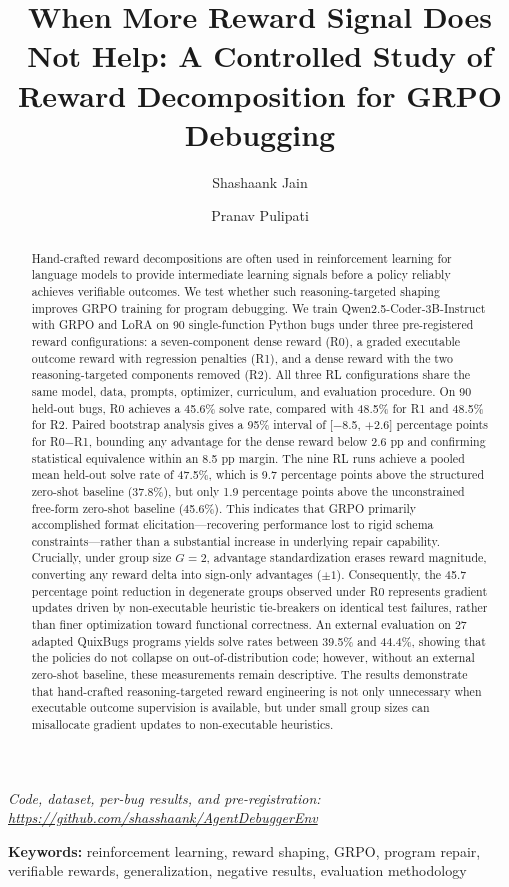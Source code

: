 \documentclass{article}
\title{When More Reward Signal Does Not Help: A Controlled Study of Reward Decomposition for GRPO Debugging}
\author{Shashaank Jain \and Pranav Pulipati}
\begin{document}
\maketitle

\begin{center}
\textit{Code, dataset, per-bug results, and pre-registration: \url{https://github.com/shasshaank/AgentDebuggerEnv}}
\end{center}

\vspace{0.3cm}
\noindent \textbf{Keywords:} reinforcement learning, reward shaping, GRPO, program repair, verifiable rewards, generalization, negative results, evaluation methodology
\vspace{0.3cm}

\begin{abstract}
Hand-crafted reward decompositions are often used in reinforcement learning for language models to provide intermediate learning signals before a policy reliably achieves verifiable outcomes. We test whether such reasoning-targeted shaping improves GRPO training for program debugging. We train Qwen2.5-Coder-3B-Instruct with GRPO and LoRA on 90 single-function Python bugs under three pre-registered reward configurations: a seven-component dense reward (R0), a graded executable outcome reward with regression penalties (R1), and a dense reward with the two reasoning-targeted components removed (R2). All three RL configurations share the same model, data, prompts, optimizer, curriculum, and evaluation procedure. On 90 held-out bugs, R0 achieves a 45.6\% solve rate, compared with 48.5\% for R1 and 48.5\% for R2. Paired bootstrap analysis gives a 95\% interval of [$-$8.5, $+$2.6] percentage points for R0$-$R1, bounding any advantage for the dense reward below 2.6 pp and confirming statistical equivalence within an 8.5 pp margin. The nine RL runs achieve a pooled mean held-out solve rate of 47.5\%, which is 9.7 percentage points above the structured zero-shot baseline (37.8\%), but only 1.9 percentage points above the unconstrained free-form zero-shot baseline (45.6\%). This indicates that GRPO primarily accomplished format elicitation—recovering performance lost to rigid schema constraints—rather than a substantial increase in underlying repair capability. Crucially, under group size $G=2$, advantage standardization erases reward magnitude, converting any reward delta into sign-only advantages ($\pm 1$). Consequently, the 45.7 percentage point reduction in degenerate groups observed under R0 represents gradient updates driven by non-executable heuristic tie-breakers on identical test failures, rather than finer optimization toward functional correctness. An external evaluation on 27 adapted QuixBugs programs yields solve rates between 39.5\% and 44.4\%, showing that the policies do not collapse on out-of-distribution code; however, without an external zero-shot baseline, these measurements remain descriptive. The results demonstrate that hand-crafted reasoning-targeted reward engineering is not only unnecessary when executable outcome supervision is available, but under small group sizes can misallocate gradient updates to non-executable heuristics.
\end{abstract}
\end{document}
